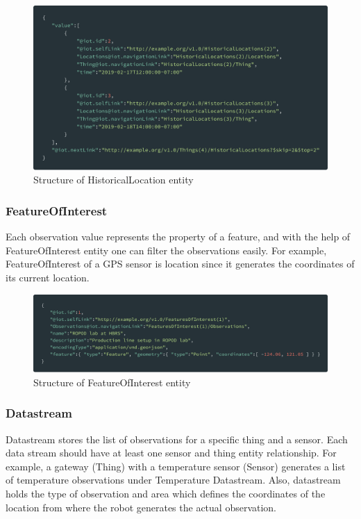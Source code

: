 	\begin{figure}[!htbp] 
		\begin{center}
			\includegraphics[scale=0.1]{./images/png/ogc/historical_location}	
			\caption{Structure of HistoricalLocation entity}	
			\label{fig:historical_location}	
		\end{center}
	\end{figure}



	\subsubsection{FeatureOfInterest}
	Each observation value represents the property of a feature, and with the help of FeatureOfInterest entity one can filter the observations easily. For example, FeatureOfInterest of a GPS sensor is location since it generates the coordinates of its current location.
	
	\begin{figure}[!htbp] 
		\begin{center}
			\includegraphics[scale=0.1]{./images/png/ogc/featureofinterest}	
			\caption{Structure of FeatureOfInterest entity}	
			\label{fig:featureofinterest}	
		\end{center}
	\end{figure}
	
	\subsubsection{Datastream}
	 Datastream stores the list of observations for a specific thing and a sensor. Each data stream should have at least one sensor and thing entity relationship. For example, a gateway (Thing) with a temperature sensor (Sensor) generates a list of temperature observations under Temperature Datastream.  Also, datastream holds the type of observation and area which defines the coordinates of the location from where the robot generates the actual observation.
	
